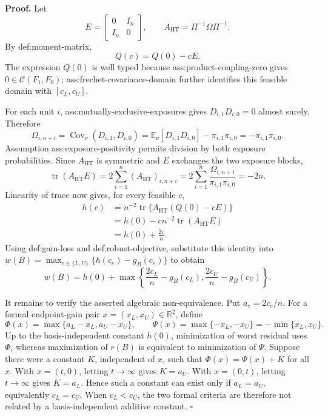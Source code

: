 \textbf{Proof.}
Let
\[
E=\begin{bmatrix}0&I_n\\ I_n&0\end{bmatrix},
\qquad
A_{\mathrm{HT}}=\Pi^{-1}\Omega\Pi^{-1}.
\]
By def:moment-matrix,
\[
Q(c)=Q(0)-cE.
\]
The expression \(Q(0)\) is well typed because ass:product-coupling-zero gives \(0\in\mathcal C(F_1,F_0)\); ass:frechet-covariance-domain further identifies this feasible domain with \([c_L,c_U]\).

For each unit \(i\), ass:mutually-exclusive-exposures gives \(D_{i,1}D_{i,0}=0\) almost surely.  Therefore
\[
\Omega_{i,n+i}
=\operatorname{Cov}_{\nu}(D_{i,1},D_{i,0})
=\mathbb E_{\nu}[D_{i,1}D_{i,0}]-\pi_{i,1}\pi_{i,0}
=-\pi_{i,1}\pi_{i,0}.
\]
Assumption ass:exposure-positivity permits division by both exposure probabilities.  Since \(A_{\mathrm{HT}}\) is symmetric and \(E\) exchanges the two exposure blocks,
\[
\operatorname{tr}(A_{\mathrm{HT}}E)
=2\sum_{i=1}^n(A_{\mathrm{HT}})_{i,n+i}
=2\sum_{i=1}^n\frac{\Omega_{i,n+i}}{\pi_{i,1}\pi_{i,0}}
=-2n.
\]
Linearity of trace now gives, for every feasible \(c\),
\[
\begin{aligned}
h(c)
&=n^{-2}\operatorname{tr}\{A_{\mathrm{HT}}(Q(0)-cE)\}\\
&=h(0)-cn^{-2}\operatorname{tr}(A_{\mathrm{HT}}E)\\
&=h(0)+\frac{2c}{n}.
\end{aligned}
\]
Using def:gain-loss and def:robust-objective, substitute this identity into
\(w(B)=\max_{e\in\{L,U\}}\{h(c_e)-g_B(c_e)\}\) to obtain
\[
w(B)=h(0)+\max\left\{
\frac{2c_L}{n}-g_B(c_L),
\frac{2c_U}{n}-g_B(c_U)
\right\}.
\]

It remains to verify the asserted algebraic non-equivalence.  Put \(a_e=2c_e/n\).  For a formal endpoint-gain pair \(x=(x_L,x_U)\in\mathbb R^2\), define
\[
\Phi(x)=\max\{a_L-x_L,a_U-x_U\},
\qquad
\Psi(x)=\max\{-x_L,-x_U\}=-\min\{x_L,x_U\}.
\]
Up to the basis-independent constant \(h(0)\), minimization of worst residual uses \(\Phi\), whereas maximization of \(r(B)\) is equivalent to minimization of \(\Psi\).  Suppose there were a constant \(K\), independent of \(x\), such that \(\Phi(x)=\Psi(x)+K\) for all \(x\).  With \(x=(t,0)\), letting \(t\to\infty\) gives \(K=a_U\).  With \(x=(0,t)\), letting \(t\to\infty\) gives \(K=a_L\).  Hence such a constant can exist only if \(a_L=a_U\), equivalently \(c_L=c_U\).  When \(c_L<c_U\), the two formal criteria are therefore not related by a basis-independent additive constant. \(\square\)